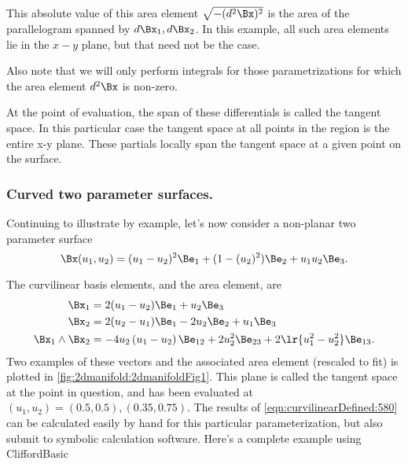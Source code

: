 This absolute value of this area element \( \sqrt{-(d^2 \Bx)^2} \) is the area of the parallelogram spanned by \( d\Bx_1, d\Bx_2 \).
In this example, all such area elements lie in the \( x-y \) plane, but that need not be the case.

Also note that we will only perform integrals for those parametrizations for which the area element \( d^2 \Bx \) is non-zero.




At the point of evaluation, the span of these differentials is called the tangent space.
In this particular case the tangent space at all points in the region is the entire x-y plane.
These partials locally span the tangent space at a given point on the surface.
\subsubsection{Curved two parameter surfaces.}
Continuing to illustrate by example, let's now consider a non-planar two parameter surface
\begin{equation}\label{eqn:curvilinearDefined:560}
\Bx(u_1, u_2) =
(u_1-u_2)^2
\Be_1
+ (1-(u_2)^2 ) \Be_2
+ u_1 u_2 \Be_3.
\end{equation}

The curvilinear basis elements, and the area element, are
\begin{equation}\label{eqn:curvilinearDefined:580}
\begin{aligned}
\Bx_1 &= 2 (u_1 - u_2) \Be_1 + u_2 \Be_3 \\
\Bx_2 &= 2 (u_2 - u_1) \Be_1 - 2 u_2 \Be_2 + u_1 \Be_3 \\
\Bx_1 \wedge \Bx_2 &=
-4 u_2
\left(u_1-u_2\right)
\Be_{12}
+2 u_2^2 \Be_{23}
+ 2
\lr{u_1^2 - u_2^2}
\Be_{13}.
\end{aligned}
\end{equation}
Two examples of these vectors and the associated area element (rescaled to fit) is plotted in
\cref{fig:2dmanifold:2dmanifoldFig1}.
This plane is called the tangent space at the point in question, and has been evaluated at \( (u_1, u_2) = (0.5,0.5), (0.35, 0.75) \).
The results of \cref{eqn:curvilinearDefined:580} can be calculated easily by hand for this particular parameterization, but also submit to symbolic calculation software.
Here's a complete example using CliffordBasic

